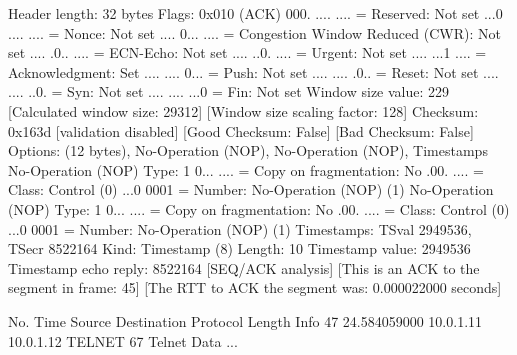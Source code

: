     Header length: 32 bytes
    Flags: 0x010 (ACK)
        000. .... .... = Reserved: Not set
        ...0 .... .... = Nonce: Not set
        .... 0... .... = Congestion Window Reduced (CWR): Not set
        .... .0.. .... = ECN-Echo: Not set
        .... ..0. .... = Urgent: Not set
        .... ...1 .... = Acknowledgment: Set
        .... .... 0... = Push: Not set
        .... .... .0.. = Reset: Not set
        .... .... ..0. = Syn: Not set
        .... .... ...0 = Fin: Not set
    Window size value: 229
    [Calculated window size: 29312]
    [Window size scaling factor: 128]
    Checksum: 0x163d [validation disabled]
        [Good Checksum: False]
        [Bad Checksum: False]
    Options: (12 bytes), No-Operation (NOP), No-Operation (NOP), Timestamps
        No-Operation (NOP)
            Type: 1
                0... .... = Copy on fragmentation: No
                .00. .... = Class: Control (0)
                ...0 0001 = Number: No-Operation (NOP) (1)
        No-Operation (NOP)
            Type: 1
                0... .... = Copy on fragmentation: No
                .00. .... = Class: Control (0)
                ...0 0001 = Number: No-Operation (NOP) (1)
        Timestamps: TSval 2949536, TSecr 8522164
            Kind: Timestamp (8)
            Length: 10
            Timestamp value: 2949536
            Timestamp echo reply: 8522164
    [SEQ/ACK analysis]
        [This is an ACK to the segment in frame: 45]
        [The RTT to ACK the segment was: 0.000022000 seconds]

No.     Time           Source                Destination           Protocol Length Info
     47 24.584059000   10.0.1.11             10.0.1.12             TELNET   67     Telnet Data ...


